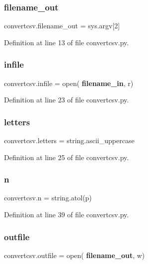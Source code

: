\subsubsection{filename\+\_\+out}
{\footnotesize\ttfamily convertcsv.\+filename\+\_\+out = sys.\+argv[2]}



Definition at line 13 of file convertcsv.\+py.

\mbox{\label{namespaceconvertcsv_a43ad18e6c37d6b57e9510b3030f02deb}} 
\subsubsection{infile}
{\footnotesize\ttfamily convertcsv.\+infile = open(\textbf{ filename\+\_\+in}, \textquotesingle{}r\textquotesingle{})}



Definition at line 23 of file convertcsv.\+py.

\mbox{\label{namespaceconvertcsv_a61a33cda3f7d11de3b8d8d906860d9e9}} 
\subsubsection{letters}
{\footnotesize\ttfamily convertcsv.\+letters = string.\+ascii\+\_\+uppercase}



Definition at line 25 of file convertcsv.\+py.

\mbox{\label{namespaceconvertcsv_adabcff17c7cab803b6b918be2f5481b5}} 
\subsubsection{n}
{\footnotesize\ttfamily convertcsv.\+n = string.\+atol(p)}



Definition at line 39 of file convertcsv.\+py.

\mbox{\label{namespaceconvertcsv_a21b468a8386333685e63eb4701c949b0}} 
\subsubsection{outfile}
{\footnotesize\ttfamily convertcsv.\+outfile = open(\textbf{ filename\+\_\+out}, \textquotesingle{}w\textquotesingle{})}




